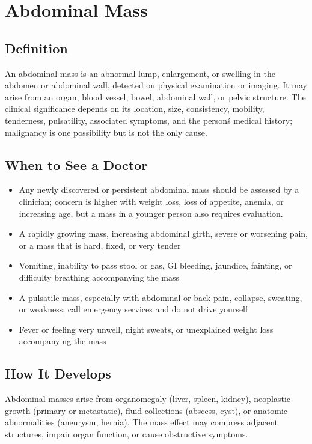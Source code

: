 \chapter{Abdominal Mass}

\section*{Definition}
An abdominal mass is an abnormal lump, enlargement, or swelling in the abdomen or abdominal wall, detected on physical examination or imaging. It may arise from an organ, blood vessel, bowel, abdominal wall, or pelvic structure. The clinical significance depends on its location, size, consistency, mobility, tenderness, pulsatility, associated symptoms, and the person\'s medical history; malignancy is one possibility but is not the only cause.

\section*{When to See a Doctor}

\begin{itemize}
 \item Any newly discovered or persistent abdominal mass should be assessed by a clinician; concern is higher with weight loss, loss of appetite, anemia, or increasing age, but a mass in a younger person also requires evaluation.
 \item A rapidly growing mass, increasing abdominal girth, severe or worsening pain, or a mass that is hard, fixed, or very tender
 \item Vomiting, inability to pass stool or gas, GI bleeding, jaundice, fainting, or difficulty breathing accompanying the mass
 \item A pulsatile mass, especially with abdominal or back pain, collapse, sweating, or weakness; call emergency services and do not drive yourself
 \item Fever or feeling very unwell, night sweats, or unexplained weight loss accompanying the mass
\end{itemize}

\section*{How It Develops}
Abdominal masses arise from organomegaly (liver, spleen, kidney), neoplastic growth (primary or metastatic), fluid collections (abscess, cyst), or anatomic abnormalities (aneurysm, hernia). The mass effect may compress adjacent structures, impair organ function, or cause obstructive symptoms.

